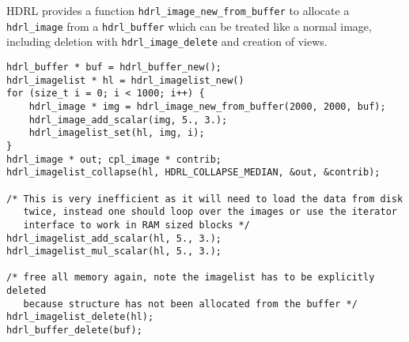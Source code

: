 HDRL provides a function \verb+hdrl_image_new_from_buffer+ to allocate a
\verb+hdrl_image+ from a \verb+hdrl_buffer+ which can be treated like a normal
image, including deletion with \verb+hdrl_image_delete+ and creation of views.

\begin{lstlisting}
hdrl_buffer * buf = hdrl_buffer_new();
hdrl_imagelist * hl = hdrl_imagelist_new()
for (size_t i = 0; i < 1000; i++) {
    hdrl_image * img = hdrl_image_new_from_buffer(2000, 2000, buf);
    hdrl_image_add_scalar(img, 5., 3.);
    hdrl_imagelist_set(hl, img, i);
}
hdrl_image * out; cpl_image * contrib;
hdrl_imagelist_collapse(hl, HDRL_COLLAPSE_MEDIAN, &out, &contrib);

/* This is very inefficient as it will need to load the data from disk
   twice, instead one should loop over the images or use the iterator
   interface to work in RAM sized blocks */
hdrl_imagelist_add_scalar(hl, 5., 3.);
hdrl_imagelist_mul_scalar(hl, 5., 3.);

/* free all memory again, note the imagelist has to be explicitly deleted
   because structure has not been allocated from the buffer */
hdrl_imagelist_delete(hl);
hdrl_buffer_delete(buf);
\end{lstlisting}

